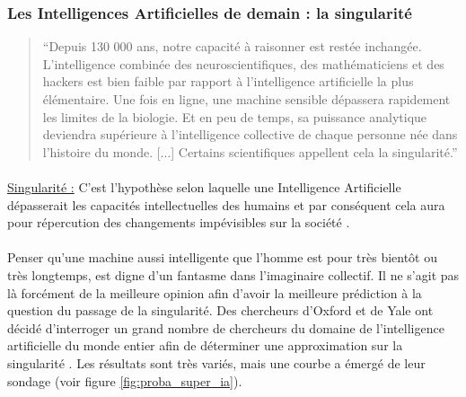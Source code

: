 \documentclass[10pt, french, a4paper]{report}
\begin{document}
\subsubsection{Les Intelligences Artificielles de demain : la singularité}

\begin{quotation}
``Depuis 130 000 ans, notre capacité à raisonner est restée inchangée. L'intelligence combinée des neuroscientifiques, des mathématiciens et des hackers est bien faible par rapport à l'intelligence artificielle la plus élémentaire. Une fois en ligne, une machine sensible dépassera rapidement les limites de la biologie. Et en peu de temps, sa puissance analytique deviendra supérieure à l'intelligence collective de chaque personne née dans l'histoire du monde. [...] Certains scientifiques appellent cela la singularité.''
\end{quotation}

\paragraph{}
\underline{Singularité :} C'est l'hypothèse selon laquelle une Intelligence Artificielle dépasserait les capacités intellectuelles des humains et par conséquent cela aura pour répercution des changements impévisibles sur la société \citep{eden_singularity_2013}.

\paragraph{}
Penser qu’une machine aussi intelligente que l’homme est pour très bientôt ou très longtemps, est digne d’un fantasme dans l’imaginaire collectif. Il ne s’agit pas là forcément de la meilleure opinion afin d’avoir la meilleure prédiction à la question du passage de la singularité. Des chercheurs d’Oxford et de Yale ont décidé d’interroger un grand nombre de chercheurs du domaine de l’intelligence artificielle du monde entier afin de déterminer une approximation sur la singularité \citep{grace_when_2017}. Les résultats sont très variés, mais une courbe a émergé de leur sondage (voir figure \ref{fig:proba_super_ia}).
\end{document}
